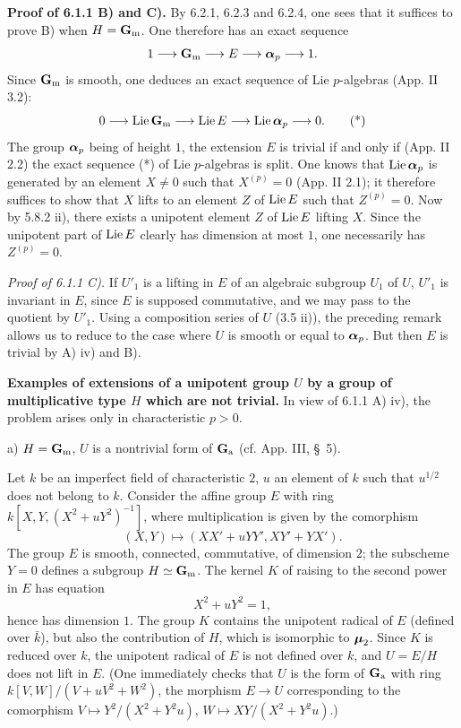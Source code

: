 \label{XVII.6.3}\textbf{Proof of 6.1.1 B) and C).}
By 6.2.1, 6.2.3 and 6.2.4, one sees that it suffices to prove B) when $H=\mathbf{G}_{\mathrm{m}}$. One therefore has an exact sequence
\[
1\longrightarrow\mathbf{G}_{\mathrm{m}}\longrightarrow E\longrightarrow\boldsymbol{\alpha}_p\longrightarrow1.
\]
Since $\mathbf{G}_{\mathrm{m}}$ is smooth, one deduces an exact sequence of Lie $p$-algebras (App. II 3.2):
\[
0\longrightarrow\operatorname{Lie}\mathbf{G}_{\mathrm{m}}\longrightarrow\operatorname{Lie} E\longrightarrow\operatorname{Lie}\boldsymbol{\alpha}_p\longrightarrow0.\tag{*}
\]
The group $\boldsymbol{\alpha}_p$ being of height $1$, the extension $E$ is trivial if and only if (App. II 2.2) the exact sequence (*) of Lie $p$-algebras is split. One knows that $\operatorname{Lie}\boldsymbol{\alpha}_p$ is generated by an element $X\ne0$ such that $X^{(p)}=0$ (App. II 2.1); it therefore suffices to show that $X$ lifts to an element $Z$ of $\operatorname{Lie} E$ such that $Z^{(p)}=0$. Now by 5.8.2 ii), there exists a unipotent element $Z$ of $\operatorname{Lie} E$ lifting $X$. Since the unipotent part of $\operatorname{Lie} E$ clearly has dimension at most $1$, one necessarily has $Z^{(p)}=0$.

\par\noindent\emph{Proof of 6.1.1 C).}
If $U'_1$ is a lifting in $E$ of an algebraic subgroup $U_1$ of $U$, $U'_1$ is invariant in $E$, since $E$ is supposed commutative, and we may pass to the quotient by $U'_1$. Using a composition series of $U$ (3.5 ii)), the preceding remark allows us to reduce to the case where $U$ is smooth or equal to $\boldsymbol{\alpha}_p$. But then $E$ is trivial by A) iv) and B).

\label{XVII.6.4}\textbf{Examples of extensions of a unipotent group $U$ by a group of multiplicative type $H$ which are not trivial.}
In view of 6.1.1 A) iv), the problem arises only in characteristic $p>0$.

\noindent a) $H=\mathbf{G}_{\mathrm{m}}$, $U$ is a nontrivial form of $\mathbf{G}_{\mathrm{a}}$ (cf. App. III, \S\ 5).

Let $k$ be an imperfect field of characteristic $2$, $u$ an element of $k$ such that $u^{1/2}$ does not belong to $k$. Consider the affine group $E$ with ring $k[X,Y,(X^2+uY^2)^{-1}]$, where multiplication is given by the comorphism
\[
(X,Y)\longmapsto(XX'+uYY',XY'+YX').
\]
The group $E$ is smooth, connected, commutative, of dimension $2$; the subscheme $Y=0$ defines a subgroup $H\simeq\mathbf{G}_{\mathrm{m}}$. The kernel $K$ of raising to the second power in $E$ has equation
\[
X^2+uY^2=1,
\]
hence has dimension $1$. The group $K$ contains the unipotent radical of $E$ (defined over $\bar k$), but also the contribution of $H$, which is isomorphic to $\boldsymbol{\mu}_2$. Since $K$ is reduced over $k$, the unipotent radical of $E$ is not defined over $k$, and $U=E/H$ does not lift in $E$. (One immediately checks that $U$ is the form of $\mathbf{G}_{\mathrm{a}}$ with ring $k[V,W]/(V+uV^2+W^2)$, the morphism $E\to U$ corresponding to the comorphism $V\mapsto Y^2/(X^2+Y^2u)$, $W\mapsto XY/(X^2+Y^2u)$.)

